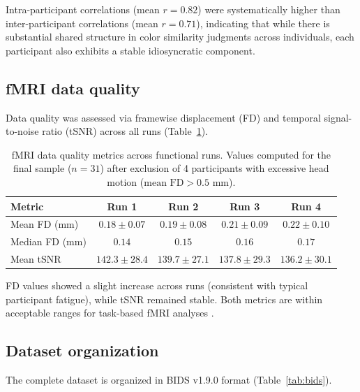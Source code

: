 \documentclass[11pt]{article}
\begin{document}
Intra-participant correlations (mean $r = 0.82$) were systematically higher than inter-participant correlations (mean $r = 0.71$), indicating that while there is substantial shared structure in color similarity judgments across individuals, each participant also exhibits a stable idiosyncratic component.

\subsection{fMRI data quality}

Data quality was assessed via framewise displacement (FD) and temporal signal-to-noise ratio (tSNR) across all runs (Table~\ref{tab:quality}).

\begin{table}[H]
\centering
\caption{fMRI data quality metrics across functional runs. Values computed for the final sample ($n = 31$) after exclusion of 4 participants with excessive head motion ($\text{mean FD} > 0.5$ mm).}
\label{tab:quality}
\begin{tabular}{lcccc}
\toprule
\textbf{Metric} & \textbf{Run 1} & \textbf{Run 2} & \textbf{Run 3} & \textbf{Run 4} \\
\midrule
Mean FD (mm) & $0.18 \pm 0.07$ & $0.19 \pm 0.08$ & $0.21 \pm 0.09$ & $0.22 \pm 0.10$ \\
Median FD (mm) & $0.14$ & $0.15$ & $0.16$ & $0.17$ \\
Mean tSNR & $142.3 \pm 28.4$ & $139.7 \pm 27.1$ & $137.8 \pm 29.3$ & $136.2 \pm 30.1$ \\
\bottomrule
\end{tabular}
\end{table}

FD values showed a slight increase across runs (consistent with typical participant fatigue), while tSNR remained stable. Both metrics are within acceptable ranges for task-based fMRI analyses \citep{power2012}.

\subsection{Dataset organization}

The complete dataset is organized in BIDS v1.9.0 format \citep{gorgolewski2016} (Table~\ref{tab:bids}).
\end{document}
